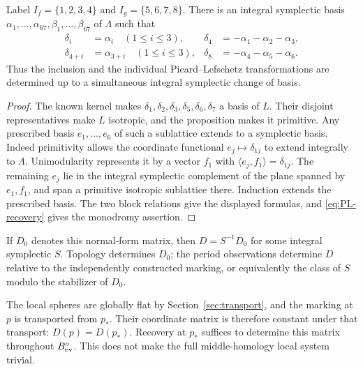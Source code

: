 \begin{corollary}\label{cor:vanishing-normal-form}
Label $I_f=\{1,2,3,4\}$ and $I_g=\{5,6,7,8\}$.
There is an integral symplectic basis
$\alpha_1,\ldots,\alpha_{67},\beta_1,\ldots,\beta_{67}$ of $\Lambda$
such that
\[
 \begin{aligned}
 \delta_i&=\alpha_i\quad(1\le i\le3),&
 \delta_4&=-\alpha_1-\alpha_2-\alpha_3,\\
 \delta_{4+i}&=\alpha_{3+i}\quad(1\le i\le3),&
 \delta_8&=-\alpha_4-\alpha_5-\alpha_6.
 \end{aligned}
\]
Thus the inclusion and the individual Picard--Lefschetz
transformations are determined up to a simultaneous integral
symplectic change of basis.
\end{corollary}

\begin{proof}
The known kernel makes
$\delta_1,\delta_2,\delta_3,\delta_5,\delta_6,\delta_7$
a basis of $L$. Their disjoint representatives make $L$ isotropic,
and the proposition makes it primitive. Any prescribed basis
$e_1,\ldots,e_6$ of such a sublattice extends to a symplectic
basis. Indeed primitivity allows the coordinate functional
$e_j\mapsto\delta_{1j}$ to extend integrally to $\Lambda$.
Unimodularity represents it by a vector $f_1$ with
$\langle e_j,f_1\rangle=\delta_{1j}$. The remaining $e_j$ lie
in the integral symplectic complement of the plane spanned by
$e_1,f_1$, and span a primitive isotropic sublattice there.
Induction extends the prescribed basis. The two block relations
give the displayed formulas, and \eqref{eq:PL-recovery} gives
the monodromy assertion.
\end{proof}

If $D_0$ denotes this normal-form matrix, then $D=S^{-1}D_0$
for some integral symplectic $S$. Topology determines $D_0$;
the period observations determine $D$ relative to the independently
constructed marking, or equivalently the class of $S$ modulo
the stabilizer of $D_0$.

The local spheres are globally flat by
Section~\ref{sec:transport}, and the marking at $p$ is transported
from $p_*$. Their coordinate matrix is therefore constant under
that transport: $D(p)=D(p_*)$. Recovery at $p_*$ suffices to
determine this matrix throughout $B_{\rm ev}^{\circ}$.
This does not make the full middle-homology local system trivial.

